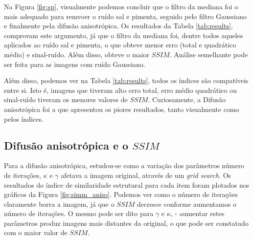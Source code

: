 \documentclass[10pt,a4paper]{article}
\begin{document}
Na Figura \ref{fig:sp}, visualmente podemos concluir que o filtro da mediana foi o mais adequado para remvoer o ruído sal e pimenta, seguido pelo filtro Gaussiano e finalmente pela difusão anisotrópica. Os resultados da Tabela \ref{tab:results}, comprovam este argumento, já que o filtro da mediana foi, dentre todos aqueles aplicados ao ruído sal e pimenta, o que obteve menor erro (total e quadrático médio) e sinal-ruído. Além disso, obteve o maior $\mathit{SSIM}$. Análise semelhante pode ser feita para as imagens com ruído Gaussiano.

Além disso, podemos ver na Tabela \ref{tab:results}, todos os índices são compatíveis entre si. Isto é, imagens que tiveram alto erro total, erro médio quadrático ou sinal-ruído tiveram os menores valores de $\mathit{SSIM}$. Curiosamente, a Difusão anisotrópica foi a que apresentou os piores resultados, tanto visualmente como pelos índices.

\subsection{Difusão anisotrópica e o $\mathit{SSIM}$}
Para a difusão anisotrópica, estudou-se como a variação dos parâmetros número de iterações, $\kappa$ e $\gamma$ afetava a imagem original, através de um \textit{grid search}. Os resultados do índice de similaridade estrutural para cada item foram plotados nos gráficos da Figura \ref{fig:simm_aniso}. Podemos ver como o número de iterações claramente borra a imagem, já que o $\mathit{SSIM}$ decresce conforme aumentamos o número de iterações. O mesmo pode ser dito para $\gamma$ e $\kappa$, - aumentar estes parâmetros produz imagens mais distantes da original, o que pode ser constatado com o maior valor de $\mathit{SSIM}$.
\end{document}
